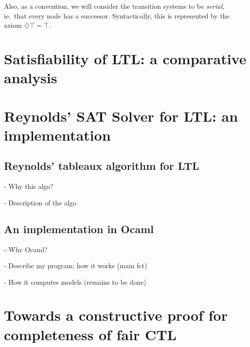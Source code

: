 \documentclass[11pt]{article}
\newcommand{\dia}{{\diamondsuit}}
\begin{document}
Also, as a convention, we will consider the transition systems to be \emph{serial}, ie.~that every node has a successor. Syntactically, this is represented by the axiom $\dia\top = \top$.

\section{Satisfiability of LTL: a comparative analysis}

\section{Reynolds' SAT Solver for LTL: an implementation}
\subsection*{Reynolds' tableaux algorithm for LTL}
- Why this algo?

- Description of the algo
\subsection*{An implementation in Ocaml}
- Why Ocaml?

- Describe my program: how it works (main fct)

- How it computes models (remains to be done)


\section{Towards a constructive proof for completeness of fair CTL}






\end{document}
